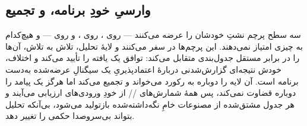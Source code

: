 \subsection{وارسیِ  خودِ برنامه، و تجمیع}
\label{sec:arch:oracle}

سه سطح پرچم نشتِ خودشان را عرضه می‌کنند ---  روی
،  روی
، و  روی
 --- و هیچ‌کدام به چیزی امتیاز نمی‌دهند. این پرچم‌ها در
 سفر می‌کنند و لایهٔ تحلیل، تلاش به تلاش، آن‌ها را در برابر
 مستقل جدول‌بندی متقابل می‌کند: توافق یک یافته را تأیید
می‌کند و اختلاف، خودش نتیجه‌ای گزارش‌شدنی دربارهٔ اعتمادپذیریِ یک سیگنالِ
عرضه‌شده به‌دست برنامه است. آن لایه  را دوباره به رکورد
می‌خواند و تجمیع می‌کند اما هرگز یک پیامد را دوباره قضاوت نمی‌کند، پس همهٔ
شمارش‌های // از خودِ ورودی‌های ارزیابی
 می‌آیند و هر جدول مشتق‌شده از مصنوعات خامِ نگه‌داشته‌شده بازتولید
می‌شود، بی‌آنکه تحلیل بتواند بی‌سروصدا حکمی را تغییر دهد.
